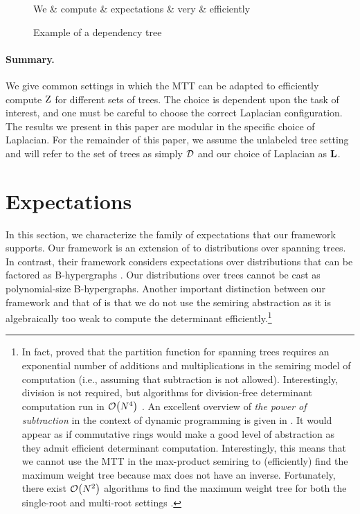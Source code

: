 \documentclass[11pt,a4paper]{article}
\theoremstyle{definition}
\begin{document}
\begin{figure}[t]
    \centering
    \begin{dependency}[theme = simple]
    \begin{deptext}[column sep=0.5em]
      We \& compute \& expectations \& very \& efficiently \\
    \end{deptext}
    \end{dependency}
    \caption{Example of a dependency tree}
    \label{fig:deptree}
\end{figure}

\paragraph{Summary.} We give common settings in which the MTT can be adapted to efficiently compute ${\mathrm{Z}}$ for different sets of trees.
The choice is dependent upon the task of interest, and one must be careful to choose the correct Laplacian configuration.
The results we present in this paper are modular in the specific choice of Laplacian.
For the remainder of this paper, we assume the unlabeled tree setting and will refer to the set of trees as simply ${\mathcal{D}}$ and our choice of Laplacian as ${\mathbf{L}}$.


\section{Expectations}
\label{sec:expect}

In this section, we characterize the family of expectations that our framework supports.
Our framework is an extension of \citet{li-eisner-2009} to distributions over spanning trees.
In contrast, their framework considers expectations over distributions that can be factored as B-hypergraphs \citep{gallo}.
Our distributions over trees cannot be cast as polynomial-size B-hypergraphs.
Another important distinction between our framework and that of \citet{li-eisner-2009} is that we do not use the semiring abstraction as it is algebraically too weak to compute the determinant efficiently.\footnote{\label{fn:generalized-mtt}In fact, \citet{Jerrum-Snir-1982} proved that the
partition function for spanning trees requires an exponential number of additions and multiplications in the semiring model of computation (i.e., assuming that subtraction is not allowed).
Interestingly, division is not required, but algorithms for division-free determinant computation run in $\mathcal{O}\!\left({N}^4\right)$ \citep{kaltofen1992computing}. An excellent overview of \emph{the power of subtraction} in the context of dynamic programming is given in \citet[Ch.\@ 3]{miklos2019computational}.  It would appear as if commutative rings would make a good level of abstraction as they admit efficient determinant computation. 
Interestingly, this means that we cannot use the MTT in the max-product semiring to (efficiently) find the maximum weight tree because max does not have an inverse.  Fortunately, there exist $\mathcal{O}\!\left({N}^2\right)$ algorithms to find the maximum weight tree for both the single-root and multi-root settings \citep{zmigrod2020mind,GabowT84}.%
}
\end{document}
